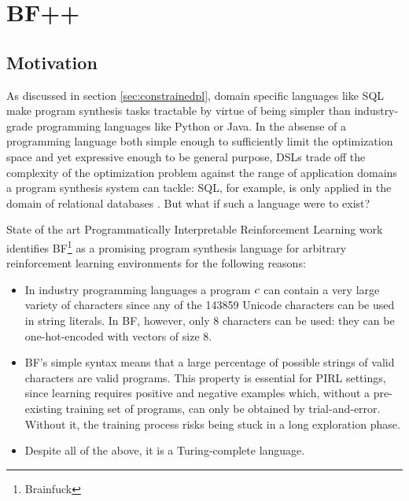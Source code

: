 \chapter{BF++}\label{ch:bfpp}


\section{Motivation}

As discussed in section \ref{sec:constrainedpl}, domain specific languages like SQL make program synthesis tasks tractable by virtue of being simpler than industry-grade programming languages like Python or Java.
In the absense of a programming language both simple enough to sufficiently limit the optimization space and yet expressive enough to be general purpose, DSLs trade off the complexity of the optimization problem against the range of application domains a program synthesis system can tackle: SQL, for example, is only applied in the domain of relational databases \cite{atzeniRelationalDatabaseTheory1993}.
But what if such a language were to exist?

State of the art Programmatically Interpretable Reinforcement Learning work \cite{abolafiaNeuralProgramSynthesis2018} identifies BF\footnote{Brainfuck} \cite{brainfuck} as a promising program synthesis language for arbitrary reinforcement learning environments for the following reasons:
\begin{itemize}
    \item In industry programming languages a program $c$ can contain a very large variety of characters since any of the 143859 Unicode \cite{allenUnicodeStandard2012} characters can be used in string literals. In BF, however, only 8 characters can be used: they can be one-hot-encoded with vectors of size 8. 
    \item BF's simple syntax means that a large percentage of possible strings of valid characters are valid programs. 
    This property is essential for PIRL settings, since learning requires positive and negative examples which, without a pre-existing training set of programs, can only be obtained by trial-and-error.
    Without it, the training process risks being stuck in a long exploration phase.
    \item Despite all of the above, it is a Turing-complete language.
\end{itemize}

